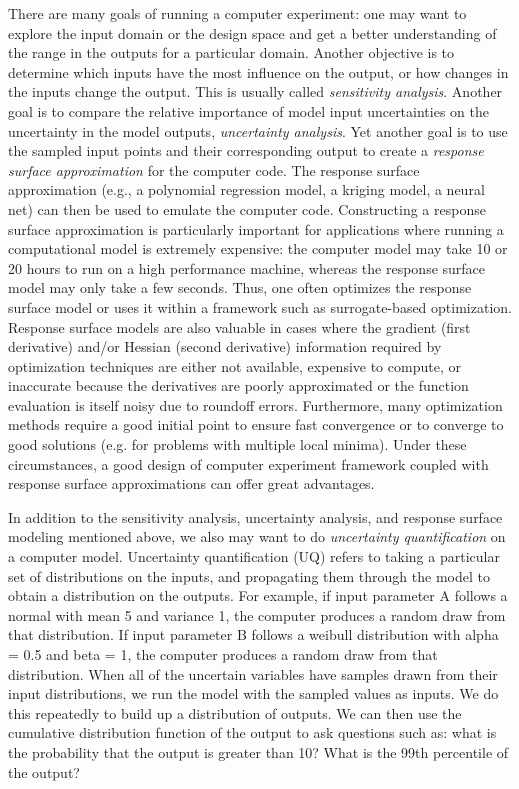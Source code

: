 There are many goals of running a computer experiment: one may want to 
explore the input domain or the design space and get a better understanding 
of the range in the outputs for a particular domain.  Another objective is 
to determine which inputs have the most influence on the output, or how 
changes in the inputs change the output.  This is usually called 
\emph{sensitivity analysis}. Another goal is to compare the relative 
importance of model input uncertainties on the uncertainty in the model 
outputs, \emph{uncertainty analysis}.  Yet another goal is to use the 
sampled input points and their corresponding output to create a 
\emph{response surface approximation} for the computer code.  The response 
surface approximation (e.g., a polynomial regression model, a kriging model, 
a neural net) can then be used to emulate the computer code.   
Constructing a response surface approximation is particularly important 
for applications where running a computational model is extremely expensive:  
the computer model may take 10 or 20 hours to run on a high performance 
machine, whereas the response surface model may only take a few seconds.  
Thus, one often optimizes the response surface model or uses it within a 
framework such as surrogate-based optimization.   Response surface models 
are also valuable in cases where the gradient (first derivative) and/or 
Hessian (second derivative) information required by optimization techniques 
are either not available, expensive to compute, or inaccurate because the 
derivatives are poorly approximated or the function evaluation is itself 
noisy due to roundoff errors.  Furthermore, many optimization methods 
require a good initial point to ensure fast convergence or to converge to 
good solutions (e.g. for problems with multiple local minima).  Under these 
circumstances, a good design of computer experiment framework coupled with 
response surface approximations can offer great advantages. 

In addition to the sensitivity analysis, uncertainty analysis, and response 
surface modeling mentioned above, we also may want to do 
\emph{uncertainty quantification} on a computer model.  
Uncertainty quantification (UQ) refers to taking a particular set of 
distributions on the inputs, and propagating them through the model to 
obtain a distribution on the outputs.  For example, if input parameter A 
follows a normal with mean 5 and variance 1, the computer produces a random 
draw from that distribution.  If input parameter B follows a weibull 
distribution with alpha = 0.5 and beta = 1, the computer produces a random 
draw from that distribution.  When all of the uncertain variables have 
samples drawn from their input distributions, we run the model with the 
sampled values as inputs.  We do this repeatedly to build up a distribution 
of outputs.  We can then use the cumulative distribution function of the 
output to ask questions such as:  what is the probability that the output is 
greater than 10?   What is the 99th percentile of the output?  

